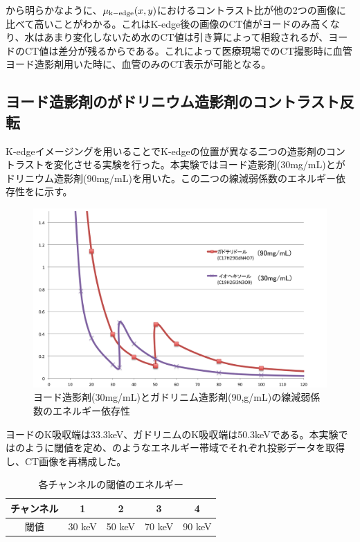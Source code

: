から明らかなように、$\mu_{\rm{k-edge}}(x,y)$におけるコントラスト比が他の2つの画像に比べて高いことがわかる。これはK-edge後の画像のCT値がヨードのみ高くなり、水はあまり変化しないため水のCT値は引き算によって相殺されるが、ヨードのCT値は差分が残るからである。これによって医療現場でのCT撮影時に血管ヨード造影剤用いた時に、血管のみのCT表示が可能となる。


\subsection{ヨード造影剤のがドリニウム造影剤のコントラスト反転}
K-edgeイメージングを用いることでK-edgeの位置が異なる二つの造影剤のコントラストを変化させる実験を行った。本実験ではヨード造影剤(30mg/mL)とがドリニウム造影剤(90mg/mL)を用いた。この二つの線減弱係数のエネルギー依存性をに示す。


\begin{figure}[H]
 \begin{center}
 \includegraphics[bb=0.000000 0.000000 640.747032 391.647624,width=0.8\hsize]{image2/chapter5/I_Gd_atten.png} 
 \end{center}
 \caption{ヨード造影剤(30mg/mL)とガドリニム造影剤(90,g/mL)の線減弱係数のエネルギー依存性}
 \label{fig:I_Gd_atten}
\end{figure}

ヨードのK吸収端は33.3keV、ガドリニムのK吸収端は50.3keVである。本実験ではのように閾値を定め、のようなエネルギー帯域でそれぞれ投影データを取得し、CT画像を再構成した。

\begin{table}[htbp]
  \centering
    \begin{tabular}{ccccc}
    \toprule
    チャンネル & 1     & 2     & 3     & 4 \\
    \midrule
    閾値    & 30 keV & 50 keV & 70 keV  & 90 keV \\
    \bottomrule
    \end{tabular}%
      \caption{各チャンネルの閾値のエネルギー}
  \label{tab: vth2}%
\end{table}%

